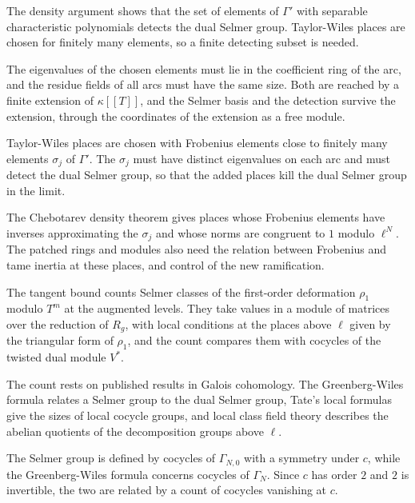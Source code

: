 The density argument shows that the set of elements of $\Gamma'$ with separable characteristic polynomials detects the dual Selmer group. Taylor-Wiles places are chosen for finitely many elements, so a finite detecting subset is needed.

The eigenvalues of the chosen elements must lie in the coefficient ring of the arc, and the residue fields of all arcs must have the same size. Both are reached by a finite extension of $\kappa[[T]]$, and the Selmer basis and the detection survive the extension, through the coordinates of the extension as a free module.

Taylor-Wiles places are chosen with Frobenius elements close to finitely many elements $\sigma_j$ of $\Gamma'$. The $\sigma_j$ must have distinct eigenvalues on each arc and must detect the dual Selmer group, so that the added places kill the dual Selmer group in the limit.

The Chebotarev density theorem gives places whose Frobenius elements have inverses approximating the $\sigma_j$ and whose norms are congruent to $1$ modulo $\ell^N$. The patched rings and modules also need the relation between Frobenius and tame inertia at these places, and control of the new ramification.

The tangent bound counts Selmer classes of the first-order deformation $\rho_1$ modulo $T^m$ at the augmented levels. They take values in a module of matrices over the reduction of $R_g$, with local conditions at the places above $\ell$ given by the triangular form of $\rho_1$, and the count compares them with cocycles of the twisted dual module $V^*$.

The count rests on published results in Galois cohomology. The Greenberg-Wiles formula relates a Selmer group to the dual Selmer group, Tate's local formulas give the sizes of local cocycle groups, and local class field theory describes the abelian quotients of the decomposition groups above $\ell$.

The Selmer group is defined by cocycles of $\Gamma_{N,0}$ with a symmetry under $c$, while the Greenberg-Wiles formula concerns cocycles of $\Gamma_N$. Since $c$ has order $2$ and $2$ is invertible, the two are related by a count of cocycles vanishing at $c$.

